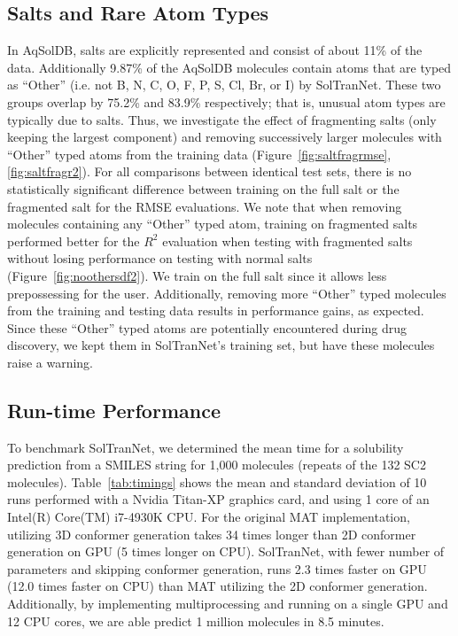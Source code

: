 \documentclass[journal=jmcmar,manuscript=article]{achemso}
\begin{document}
\subsection{Salts and Rare Atom Types}
In AqSolDB, salts are explicitly represented and consist of about 11\% of the data.
Additionally 9.87\% of the AqSolDB molecules contain atoms that are typed as ``Other'' (i.e. not B, N, C, O, F, P, S, Cl, Br, or I) by SolTranNet.
These two groups overlap by 75.2\% and 83.9\% respectively; that is, unusual atom types are typically due to salts.
Thus, we investigate the effect of fragmenting salts (only keeping the largest component) and removing successively larger molecules with ``Other'' typed atoms from the training data (Figure~\ref{fig:saltfragrmse},\ref{fig:saltfragr2}).
For all comparisons between identical test sets, there is no statistically significant difference between training on the full salt or the fragmented salt for the RMSE evaluations.
We note that when removing molecules containing any ``Other'' typed atom, training on fragmented salts performed better for the $R^2$ evaluation when testing with fragmented salts without losing performance on testing with normal salts (Figure~\ref{fig:noothersdf2}).
We train on the full salt since it allows less prepossessing for the user.
Additionally, removing more ``Other'' typed molecules from the training and testing data results in performance gains, as expected.
Since these ``Other'' typed atoms are potentially encountered during drug discovery, we kept them in SolTranNet's training set, but have these molecules raise a warning.

\subsection{Run-time Performance}

To benchmark SolTranNet, we determined the mean time for a solubility prediction from a SMILES string for 1,000 molecules (repeats of the 132 SC2 molecules).
Table~\ref{tab:timings} shows the mean and standard deviation of 10 runs performed with a Nvidia Titan-XP graphics card, and using 1 core of an Intel(R) Core(TM) i7-4930K CPU.
For the original MAT implementation, utilizing 3D conformer generation takes 34 times longer than 2D conformer generation on GPU (5 times longer on CPU).
SolTranNet, with fewer number of parameters and skipping conformer generation, runs 2.3 times faster on GPU (12.0 times faster on CPU) than MAT utilizing the 2D conformer generation.
Additionally, by implementing multiprocessing and running on a single GPU and 12 CPU cores, we are able predict 1 million molecules in 8.5 minutes.
\end{document}
